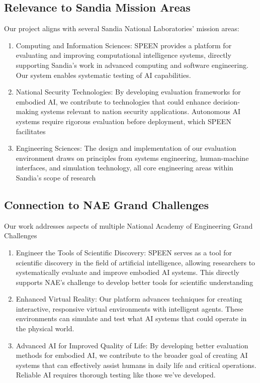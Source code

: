 \documentclass{article}
\begin{document}
\subsection{Relevance to Sandia Mission Areas}
Our project aligns with several Sandia National Laboratories' mission areas:
\begin{enumerate}
    \item Computing and Information Sciences: SPEEN provides a platform for evaluating and improving computational intelligence systems, directly supporting Sandia's work in advanced computing and software engineering.
          Our system enables systematic testing of AI capabilities.
    \item National Security Technologies: By developing evaluation frameworks for embodied AI, we contribute to technologies that could enhance decision-making systems relevant to nation security applications.
          Autonomous AI systems require rigorous evaluation before deployment, which SPEEN facilitates
    \item Engineering Sciences: The design and implementation of our evaluation environment draws on principles from systems engineering, human-machine interfaces, and simulation technology, all core engineering areas within Sandia's scope of research
\end{enumerate}

\subsection{Connection to NAE Grand Challenges}
Our work addresses aspects of multiple National Academy of Engineering Grand Challenges
\begin{enumerate}
    \item Engineer the Tools of Scientific Discovery: SPEEN serves as a tool for scientific discovery in the field of artificial intelligence, allowing researchers to systematically evaluate and improve embodied AI systems.
          This directly supports NAE's challenge to develop better tools for scientific understanding
    \item Enhanced Virtual Reality: Our platform advances techniques for creating interactive, responsive virtual environments with intelligent agents.
          These environments can simulate and test what AI systems that could operate in the physical world.
    \item Advanced AI for Improved Quality of Life: By developing better evaluation methods for embodied AI, we contribute to the broader goal of creating AI systems that can effectively assist humans in daily life and critical operations.
          Reliable AI requires thorough testing like those we've developed.
\end{enumerate}
\end{document}
